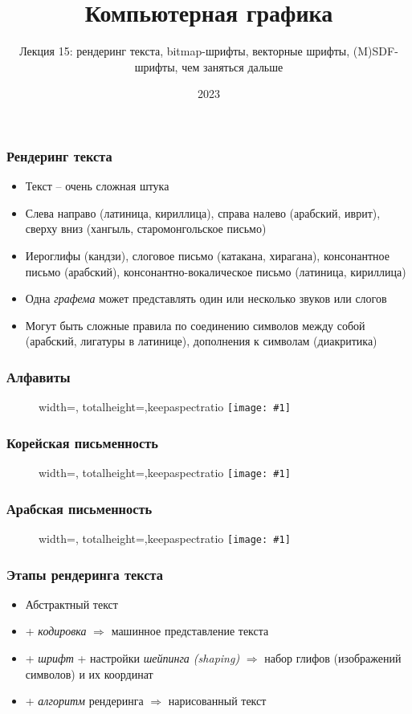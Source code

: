\documentclass{beamer}
\title{Компьютерная графика}
\subtitle{Лекция 15: рендеринг текста, bitmap-шрифты, векторные шрифты, (M)SDF-шрифты, чем заняться дальше}
\date{2023}
\newcommand{\slideimage}[1]{
  \begin{figure}
    \begin{adjustbox}{width=\textwidth, totalheight=\textheight-2\baselineskip-2\baselineskip,keepaspectratio}
      \texttt{[image: \#1]}
    \end{adjustbox}
  \end{figure}
}
\begin{document}
\frame{\titlepage}

\begin{frame}[fragile]
\frametitle{Рендеринг текста}
\begin{itemize}
\item Текст -- очень сложная штука
\pause
\item Слева направо (латиница, кириллица), справа налево (арабский, иврит), сверху вниз (хангыль, старомонгольское письмо)
\pause
\item Иероглифы (кандзи), слоговое письмо (катакана, хирагана), консонантное письмо (арабский), консонантно-вокалическое письмо (латиница, кириллица)
\pause
\item Одна \textit{графема} может представлять один или несколько звуков или слогов
\pause
\item Могут быть сложные правила по соединению символов между собой (арабский, лигатуры в латинице), дополнения к символам (диакритика)
\end{itemize}
\end{frame}

\begin{frame}[fragile]
\frametitle{Алфавиты}
\slideimage{alphabet.jpg}
\end{frame}

\begin{frame}[fragile]
\frametitle{Корейская письменность}
\slideimage{korean.png}
\end{frame}

\begin{frame}[fragile]
\frametitle{Арабская письменность}
\slideimage{arabic.png}
\end{frame}

\begin{frame}[fragile]
\frametitle{Этапы рендеринга текста}
\begin{itemize}
\item Абстрактный текст
\pause
\item + \textit{кодировка} \begin{math}\Longrightarrow\end{math} машинное представление текста
\pause
\item + \textit{шрифт} + настройки \textit{шейпинга (shaping)} \begin{math}\Longrightarrow\end{math} набор глифов (изображений символов) и их координат
\pause
\item + \textit{алгоритм} рендеринга \begin{math}\Longrightarrow\end{math} нарисованный текст
\end{itemize}
\end{frame}
\end{document}
